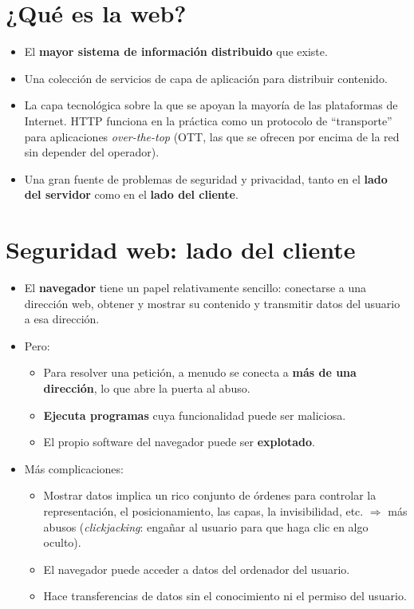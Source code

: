 \documentclass[11pt,a4paper]{report}
\begin{document}
\section{¿Qué es la web?}
 
\begin{itemize}
  \item El \textbf{mayor sistema de información distribuido} que existe.
  \item Una colección de servicios de capa de aplicación para distribuir contenido.
  \item La capa tecnológica sobre la que se apoyan la mayoría de las plataformas de Internet. HTTP funciona en la práctica como un protocolo de ``transporte'' para aplicaciones \emph{over-the-top} (OTT, las que se ofrecen por encima de la red sin depender del operador).
  \item Una gran fuente de problemas de seguridad y privacidad, tanto en el \textbf{lado del servidor} como en el \textbf{lado del cliente}.
\end{itemize}
 
\section{Seguridad web: lado del cliente}
 
\begin{itemize}
  \item El \textbf{navegador} tiene un papel relativamente sencillo: conectarse a una dirección web, obtener y mostrar su contenido y transmitir datos del usuario a esa dirección.
  \item Pero:
    \begin{itemize}
      \item Para resolver una petición, a menudo se conecta a \textbf{más de una dirección}, lo que abre la puerta al abuso.
      \item \textbf{Ejecuta programas} cuya funcionalidad puede ser maliciosa.
      \item El propio software del navegador puede ser \textbf{explotado}.
    \end{itemize}
  \item Más complicaciones:
    \begin{itemize}
      \item Mostrar datos implica un rico conjunto de órdenes para controlar la representación, el posicionamiento, las capas, la invisibilidad, etc. $\Rightarrow$ más abusos (\emph{clickjacking}: engañar al usuario para que haga clic en algo oculto).
      \item El navegador puede acceder a datos del ordenador del usuario.
      \item Hace transferencias de datos sin el conocimiento ni el permiso del usuario.
    \end{itemize}
\end{itemize}
 
\end{document}
